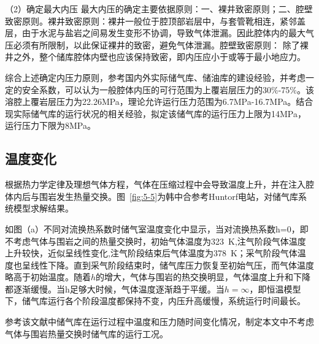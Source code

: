 （2）确定最大内压
最大内压的确定主要依据原则：一、裸井致密原则；二、腔壁致密原则。裸井致密原则：裸井一般位于腔顶部岩层中，与套管靴相连，紧邻盖层，由于水泥与盐岩之间易发生变形不协调，导致气体泄漏。因此腔体内的最大气压必须有所限制，以此保证裸井的致密，避免气体泄漏。腔壁致密原则：
除了裸井之外，整个储库腔体内壁也应该保持致密，即内压应小于或等于最小地应力\cite{梁卫国2008层状盐岩储气库物理力学特性与极限运行压力}。

综合上述确定内压力原则，参考国内外实际储气库、储油库的建设经验，并考虑一定的安全系数，可以认为一般腔体内压的可行范围为上覆岩层压力的30$\%$-75$\%$\cite{王贞硕2020层状盐岩中水平腔压气蓄能储库顶板稳定性研究}。该溶腔上覆岩层压力为22.26MPa，理论允许运行压力范围为6.7MPa-16.7MPa。结合现实际储气库的运行状况的相关经验，拟定该储气库的运行压力上限为14MPa，运行压力下限为8MPa。

\subsection{温度变化}
根据热力学定律及理想气体方程，气体在压缩过程中会导致温度上升，并在注入腔体内后与围岩发生热量交换。图~\ref{fig:5-5}为韩中合参考Huntorf电站，对储气库系统模型求解结果\cite{韩中合2017储气室热力学特性对}。

如图（a）不同对流换热系数时储气室温度变化中显示，当对流换热系数h=0，即不考虑气体与围岩之间的热量交换时，初始气体温度为\SI{323}{K},注气阶段气体温度上升较快，近似呈线性变化,注气阶段结束后气体温度为\SI{378}{K}；采气阶段气体温度也呈线性下降。直到采气阶段结束时，储气库压力恢复至初始气压，而气体温度略高于初始温度。随着$h$的增大，气体与围岩的热交换明显，气体温度上升和下降都逐渐缓慢。当h足够大时候，气体温度逐渐趋于平缓。当$h=\infty$，即恒温模型下，储气库运行各个阶段温度都保持不变，内压升高缓慢，系统运行时间最长。

参考该文献中储气库在运行过程中温度和压力随时间变化情况，制定本文中不考虑气体与围岩热量交换时储气库的运行工况。


